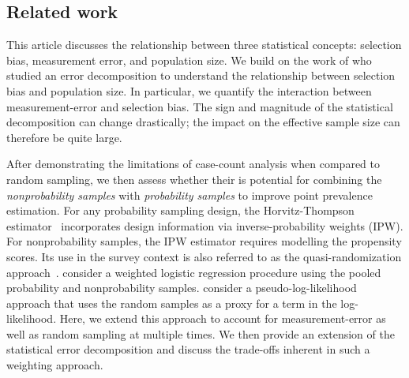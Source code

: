 \documentclass[12pt]{amsart}
\numberwithin{equation}{section}
\theoremstyle{plain}
\begin{document}
\subsection{Related work}

This article discusses the relationship between three statistical concepts: selection bias, measurement error, and population size.  We build on the work of \cite{Meng2018} who studied an error decomposition to understand the relationship between selection bias and population size.  In particular, we quantify the interaction between measurement-error and selection bias.  The sign and magnitude of the statistical decomposition can change drastically; the impact on the effective sample size can therefore be quite large.

After demonstrating the limitations of case-count analysis when compared to random sampling, we then assess whether their is potential for combining the \emph{nonprobability samples} with \emph{probability samples} to improve point prevalence estimation. For any probability sampling design, the Horvitz-Thompson estimator~\citep{HT1952} incorporates design information via inverse-probability weights (IPW).  For nonprobability samples, the IPW estimator requires modelling the propensity scores.  Its use in the survey context is also referred to as the quasi-randomization approach~\citep{Elliott2017}. \cite{Valliant2011} consider a weighted logistic regression procedure using the pooled probability and nonprobability samples.  \cite{Chen2019} consider a pseudo-log-likelihood approach that uses the random samples as a proxy for a term in the log-likelihood.  Here, we extend this approach to account for measurement-error as well as random sampling at multiple times. We then provide an extension of the statistical error decomposition and discuss the trade-offs inherent in such a weighting approach.
\end{document}
